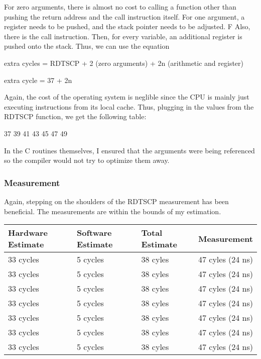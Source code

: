 \documentclass[paper=a4, fontsize=11pt]{scrartcl}
\numberwithin{equation}{section}        %
\numberwithin{figure}{section}          %
\numberwithin{table}{section}               %
\begin{document}
For zero arguments, there is almost no cost to calling a function other than pushing the return address and the call instruction itself.  For one argument, a register needs to be pushed, and the stack pointer needs to be adjusted.   F  Also, there is the call instruction. Then, for every variable, an additional register is pushed onto the stack.  Thus, we can use the equation

extra cycles = RDTSCP + 2 (zero arguments) + 2n (arithmetic and register) 

extra cycle = 37 + 2n

Again, the cost of the operating system is neglible since the CPU is mainly just executing instructions from its local cache.  Thus, plugging in the values from the RDTSCP function, we get the following table:

37
39
41
43
45
47
49

In the C routines themselves, I ensured that the arguments were being referenced so the compiler would not try to optimize them away.

\subsubsection{Measurement}

Again, stepping on the shoulders of the RDTSCP measurement has been beneficial.  The measurements are within the bounds of my estimation.

\begin{center}
    \begin{tabular}{ | l | l | l | p{5cm} |}
    \hline
    Hardware Estimate & Software Estimate & Total Estimate & Measurement \\ \hline
    33 cycles & 5 cycles & 38 cyles & 47 cyles (24 ns) \\ \hline
    33 cycles & 5 cycles & 38 cyles & 47 cyles (24 ns) \\  \hline
    33 cycles & 5 cycles & 38 cyles & 47 cyles (24 ns) \\  \hline
    33 cycles & 5 cycles & 38 cyles & 47 cyles (24 ns) \\  \hline
    33 cycles & 5 cycles & 38 cyles & 47 cyles (24 ns) \\  \hline
    33 cycles & 5 cycles & 38 cyles & 47 cyles (24 ns) \\  \hline
    33 cycles & 5 cycles & 38 cyles & 47 cyles (24 ns) \\ 
    \hline
    \end{tabular}
\end{center}
\end{document}
